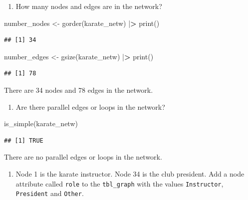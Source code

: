 \documentclass[
]{article}
\newenvironment{Shaded}{\begin{snugshade}}{\end{snugshade}}
\newcommand{\ErrorTok}[1]{\textcolor[rgb]{0.64,0.00,0.00}{\textbf{#1}}}
\newcommand{\FunctionTok}[1]{\textcolor[rgb]{0.00,0.00,0.00}{#1}}
\newcommand{\NormalTok}[1]{#1}
\newcommand{\OtherTok}[1]{\textcolor[rgb]{0.56,0.35,0.01}{#1}}
\newcommand{\SpecialCharTok}[1]{\textcolor[rgb]{0.00,0.00,0.00}{#1}}
\providecommand{\tightlist}{%
  \setlength{\itemsep}{0pt}\setlength{\parskip}{0pt}}
\begin{document}
\begin{enumerate}
\def\labelenumi{(\arabic{enumi})}
\setcounter{enumi}{1}
\tightlist
\item
  How many nodes and edges are in the network?
\end{enumerate}

\begin{Shaded}
\begin{Highlighting}[]
\NormalTok{number\_nodes }\OtherTok{\textless{}{-}} \FunctionTok{gorder}\NormalTok{(karate\_netw) }\SpecialCharTok{|}\ErrorTok{\textgreater{}} \FunctionTok{print}\NormalTok{()}
\end{Highlighting}
\end{Shaded}

\begin{verbatim}
## [1] 34
\end{verbatim}

\begin{Shaded}
\begin{Highlighting}[]
\NormalTok{number\_edges }\OtherTok{\textless{}{-}} \FunctionTok{gsize}\NormalTok{(karate\_netw) }\SpecialCharTok{|}\ErrorTok{\textgreater{}} \FunctionTok{print}\NormalTok{()}
\end{Highlighting}
\end{Shaded}

\begin{verbatim}
## [1] 78
\end{verbatim}

\Ans There are 34 nodes and 78 edges in the network.

\begin{enumerate}
\def\labelenumi{(\arabic{enumi})}
\setcounter{enumi}{2}
\tightlist
\item
  Are there parallel edges or loops in the network?
\end{enumerate}

\begin{Shaded}
\begin{Highlighting}[]
\FunctionTok{is\_simple}\NormalTok{(karate\_netw)}
\end{Highlighting}
\end{Shaded}

\begin{verbatim}
## [1] TRUE
\end{verbatim}

\Ans There are no parallel edges or loops in the network.

\begin{enumerate}
\def\labelenumi{(\arabic{enumi})}
\setcounter{enumi}{3}
\tightlist
\item
  Node 1 is the karate instructor. Node 34 is the club president. Add a
  node attribute called \texttt{role} to the \texttt{tbl\_graph} with
  the values \texttt{Instructor}, \texttt{President} and \texttt{Other}.
\end{enumerate}
\end{document}
